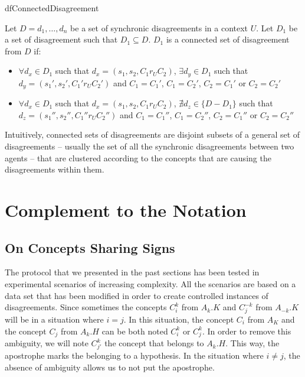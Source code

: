 \begin{restatable}{df}{ConnectedDisagreement}
\label{df:ConDisagreement}

Let $D = d_{1}, \ldots, d_{n}$ be a set of synchronic disagreements in a context $U$. Let $D_{1}$ be a set of disagreement such that $D_{1} \subseteq D$. $D_{1}$ is a connected set of disagreement from $D$ if:

\begin{itemize}
    \item $\forall d_{x} \in D_{1}$ such that $d_{x} = (s_{1}, s_{2},C_{1} r_{U} C_{2})$, $\exists d_{y} \in D_{1}$ such that $d_{y} = (s_{1}', s_{2}',C_{1}' r_{U} C_{2}')$ and $C_{1} = C_{1}'$, $C_{1} = C_{2}'$, $C_{2} = C_{1}'$ or $C_{2} = C_{2}'$
    \item $\forall d_{x} \in D_{1}$ such that $d_{x} = (s_{1}, s_{2},C_{1} r_{U} C_{2})$, $\nexists d_{z} \in \{D - D_{1}\}$ such that $d_{z}= (s_{1}'', s_{2}'',C_{1}'' r_{U} C_{2}'')$ and $C_{1} = C_{1}''$, $C_{1} = C_{2}''$, $C_{2} = C_{1}''$ or $C_{2} = C_{2}''$
\end{itemize}

\end{restatable}

Intuitively, connected sets of disagreements are disjoint subsets of a general set of disagreements -- usually the set of all the synchronic disagreements between two agents -- that are clustered according to the concepts that are causing the disagreements within them.

\section{Complement to the Notation}\label{sec:FormRemarks}

\subsection{On Concepts Sharing Signs}\label{sec:SharingSigns}
The protocol that we presented in the past sections has been tested in experimental scenarios of increasing complexity. All the scenarios are based on a data set that has been modified in order to create controlled instances of disagreements. Since sometimes the concepts $C_{i}^{k}$ from $A_{k}.K$ and $C_{j}^{-k}$ from $A_{-k}.K$ will be in a situation where $i = j$. In this situation, the concept $C_{i}$ from $A_{K}$ and the concept $C_{j}$ from $A_{k}.H$ can be both noted $C_{i}^{k}$ or $C_{j}^{k}$. In order to remove this ambiguity, we will note $C_{j'}^{k}$ the concept that belongs to $A_{k}.H$. This way, the apostrophe marks the belonging to a hypothesis. In the situation where $i \neq j$, the absence of ambiguity allows us to not put the apostrophe.

